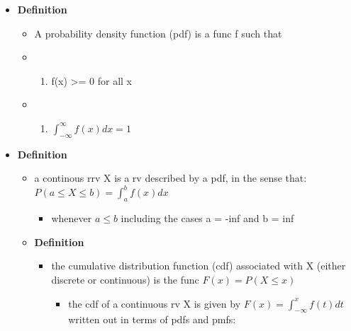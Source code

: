 \documentclass[
]{article}
\providecommand{\tightlist}{%
  \setlength{\itemsep}{0pt}\setlength{\parskip}{0pt}}
\begin{document}
\begin{itemize}
\tightlist
\item
  \textbf{Definition}

  \begin{itemize}
  \item
    A probability density function (pdf) is a func f such that
  \item
    \begin{enumerate}
    \def\labelenumi{\arabic{enumi}.}
    \tightlist
    \item
      f(x) \textgreater= 0 for all x
    \end{enumerate}
  \item
    \begin{enumerate}
    \def\labelenumi{\arabic{enumi}.}
    \setcounter{enumi}{1}
    \tightlist
    \item
      \(\int_{-\infty}^{\infty}f(x)dx = 1\)
    \end{enumerate}
  \end{itemize}
\item
  \textbf{Definition}

  \begin{itemize}
  \tightlist
  \item
    a continous rrv X is a rv described by a pdf, in the sense that:
    \(P(a \leq X \leq b) = \int_{a}^{b}f(x)dx\)

    \begin{itemize}
    \tightlist
    \item
      whenever \(a \leq b\) including the cases a = -inf and b = inf
    \end{itemize}
  \item
    \textbf{Definition}

    \begin{itemize}
    \tightlist
    \item
      the cumulative distribution function (cdf) associated with X
      (either discrete or continuous) is the func \(F(x) = P(X \leq x)\)

      \begin{itemize}
      \tightlist
      \item
        the cdf of a continuous rv X is given by
        \(F(x) = \int_{-\infty}^{x}f(t)dt\) written out in terms of pdfs
        and pmfs:


\end{itemize}
\end{itemize}
\end{itemize}
\end{itemize}
\end{document}
